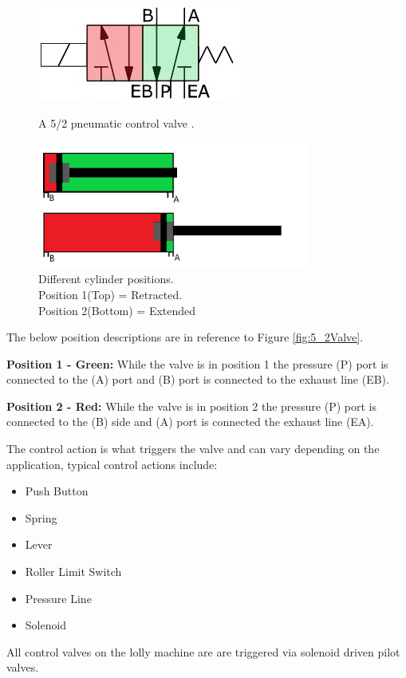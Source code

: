     \begin{figure}[H]
    \centering
    \begin{minipage}{0.45\textwidth}
        \centering
        \includegraphics[scale = 0.5]{2_images/5_2Valve.png}
        \caption{A 5/2 pneumatic control valve \cite{5_2Valves}.}
        \label{fig:5_2Valve}
    \end{minipage}\hfill
    \begin{minipage}{0.5\textwidth}
        \centering
        \includegraphics[width = 0.8\textwidth]{2_images/cylinderAB.png}
        \caption{Different cylinder positions. \\Position 1(Top) = Retracted. \\Position 2(Bottom) = Extended}
        \label{fig:cylinderAB}
    \end{minipage}\hfill            
    \end{figure}          
   
   The below position descriptions are in reference to Figure \ref{fig:5_2Valve}.
    \begin{description}
        \item\textbf{Position 1 - Green:}
        While the valve is in position 1 the pressure (P) port is connected to the (A) port and (B) port is connected to the exhaust line (EB).
        \item\textbf{Position 2 - Red:}
        While the valve is in position 2 the pressure (P) port is connected to the (B) side and (A) port is connected the exhaust line (EA). 
    \end{description}
    
 \newpage  
    The control action is what triggers the valve and can vary depending on the application, typical control actions include\cite{parr2011hydraulics}:
    \begin{itemize}
        \item Push Button
        \item Spring
        \item Lever
        \item Roller Limit Switch
        \item Pressure Line
        \item Solenoid
    \end{itemize}
    
    All control valves on the lolly machine are are triggered via solenoid driven pilot valves.